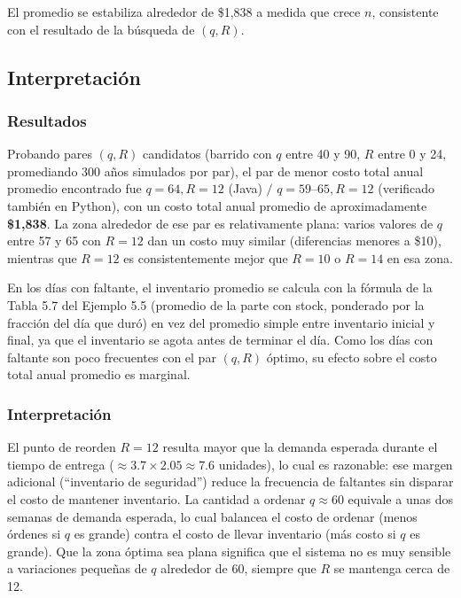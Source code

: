 \documentclass[12pt, a4paper]{article}
\begin{document}
El promedio se estabiliza alrededor de \$1,838 a medida que crece $n$, consistente con el resultado de la búsqueda de $(q,R)$.

\subsection{Interpretación}

\subsubsection{Resultados}

Probando pares $(q,R)$ candidatos (barrido con $q$ entre 40 y 90, $R$ entre 0 y 24, promediando 300 años simulados por par), el par de menor costo total anual promedio encontrado fue $q=64, R=12$ (Java) $/$ $q=59\text{--}65, R=12$ (verificado también en Python), con un costo total anual promedio de aproximadamente \textbf{\$1,838}. La zona alrededor de ese par es relativamente plana: varios valores de $q$ entre 57 y 65 con $R=12$ dan un costo muy similar (diferencias menores a \$10), mientras que $R=12$ es consistentemente mejor que $R=10$ o $R=14$ en esa zona.

En los días con faltante, el inventario promedio se calcula con la fórmula de la Tabla 5.7 del Ejemplo 5.5 (promedio de la parte con stock, ponderado por la fracción del día que duró) en vez del promedio simple entre inventario inicial y final, ya que el inventario se agota antes de terminar el día. Como los días con faltante son poco frecuentes con el par $(q,R)$ óptimo, su efecto sobre el costo total anual promedio es marginal.

\subsubsection{Interpretación}

El punto de reorden $R=12$ resulta mayor que la demanda esperada durante el tiempo de entrega ($\approx 3.7 \times 2.05 \approx 7.6$ unidades), lo cual es razonable: ese margen adicional (``inventario de seguridad'') reduce la frecuencia de faltantes sin disparar el costo de mantener inventario. La cantidad a ordenar $q \approx 60$ equivale a unas dos semanas de demanda esperada, lo cual balancea el costo de ordenar (menos órdenes si $q$ es grande) contra el costo de llevar inventario (más costo si $q$ es grande). Que la zona óptima sea plana significa que el sistema no es muy sensible a variaciones pequeñas de $q$ alrededor de 60, siempre que $R$ se mantenga cerca de 12.
\end{document}

